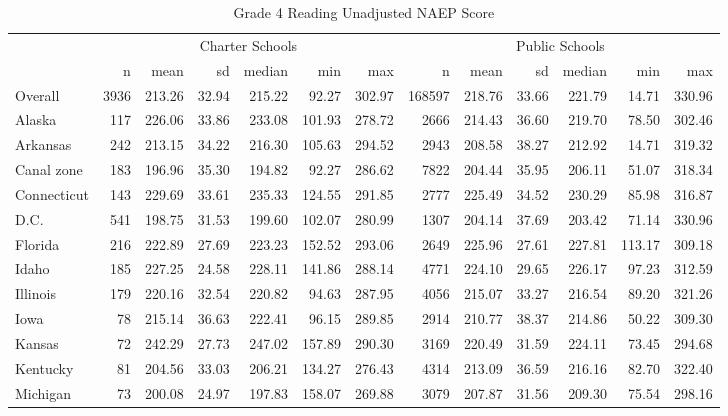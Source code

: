 \begin{sidewaystable}[ht]
\centering
\caption{Grade 4 Reading Unadjusted NAEP Score} 
\label{tab:g4read-unadjscore}
\begin{tabular}{lrrrrrr@{\extracolsep{10pt}}rrrrrr}
  \hline & \multicolumn{6}{c}{Charter Schools} & \multicolumn{6}{c}{Public Schools} \\ \cline{2-7} \cline{8-13} & n & mean & sd & median & min & max & n & mean & sd & median & min & max \\ 
  \hline
Overall & 3936 & 213.26 & 32.94 & 215.22 & 92.27 & 302.97 & 168597 & 218.76 & 33.66 & 221.79 & 14.71 & 330.96 \\ 
  Alaska & 117 & 226.06 & 33.86 & 233.08 & 101.93 & 278.72 & 2666 & 214.43 & 36.60 & 219.70 & 78.50 & 302.46 \\ 
  Arkansas & 242 & 213.15 & 34.22 & 216.30 & 105.63 & 294.52 & 2943 & 208.58 & 38.27 & 212.92 & 14.71 & 319.32 \\ 
  Canal zone & 183 & 196.96 & 35.30 & 194.82 & 92.27 & 286.62 & 7822 & 204.44 & 35.95 & 206.11 & 51.07 & 318.34 \\ 
  Connecticut & 143 & 229.69 & 33.61 & 235.33 & 124.55 & 291.85 & 2777 & 225.49 & 34.52 & 230.29 & 85.98 & 316.87 \\ 
  D.C. & 541 & 198.75 & 31.53 & 199.60 & 102.07 & 280.99 & 1307 & 204.14 & 37.69 & 203.42 & 71.14 & 330.96 \\ 
  Florida & 216 & 222.89 & 27.69 & 223.23 & 152.52 & 293.06 & 2649 & 225.96 & 27.61 & 227.81 & 113.17 & 309.18 \\ 
  Idaho & 185 & 227.25 & 24.58 & 228.11 & 141.86 & 288.14 & 4771 & 224.10 & 29.65 & 226.17 & 97.23 & 312.59 \\ 
  Illinois & 179 & 220.16 & 32.54 & 220.82 & 94.63 & 287.95 & 4056 & 215.07 & 33.27 & 216.54 & 89.20 & 321.26 \\ 
  Iowa &  78 & 215.14 & 36.63 & 222.41 & 96.15 & 289.85 & 2914 & 210.77 & 38.37 & 214.86 & 50.22 & 309.30 \\ 
  Kansas &  72 & 242.29 & 27.73 & 247.02 & 157.89 & 290.30 & 3169 & 220.49 & 31.59 & 224.11 & 73.45 & 294.68 \\ 
  Kentucky &  81 & 204.56 & 33.03 & 206.21 & 134.27 & 276.43 & 4314 & 213.09 & 36.59 & 216.16 & 82.70 & 322.40 \\ 
  Michigan &  73 & 200.08 & 24.97 & 197.83 & 158.07 & 269.88 & 3079 & 207.87 & 31.56 & 209.30 & 75.54 & 298.16 \\ 

\end{tabular}
\end{sidewaystable}
